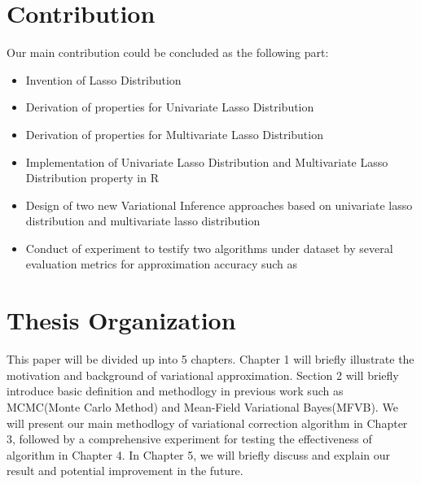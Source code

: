 \section{Contribution}
\label{cont}
Our main contribution could be concluded as the following part:
\begin{itemize}
	\item Invention of Lasso Distribution
	\item Derivation of properties for Univariate Lasso Distribution
	\item Derivation of properties for Multivariate Lasso Distribution
	\item Implementation of Univariate Lasso Distribution and Multivariate Lasso Distribution property in R
	\item Design of two new Variational Inference approaches based on univariate lasso distribution and multivariate lasso distribution
	\item Conduct of experiment to testify two algorithms under     dataset by several evaluation metrics for approximation accuracy such as
\end{itemize}



\section{Thesis Organization}
This paper will be divided up into 5 chapters. Chapter 1 will briefly illustrate the motivation and background of variational approximation. Section 2 will briefly introduce basic definition and methodlogy in previous work such as MCMC(Monte Carlo Method) and Mean-Field Variational Bayes(MFVB). We will present our main methodlogy of variational correction algorithm in Chapter 3, followed by a comprehensive experiment for testing the effectiveness of algorithm in Chapter 4. In Chapter 5, we will briefly discuss and explain our result and potential improvement in the future. 



 